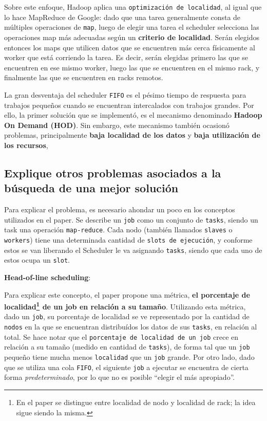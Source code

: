 \documentclass[11pt, a4paper, twoside]{article}
\begin{document}
Sobre este enfoque, Hadoop aplica una \texttt{optimización de localidad}, al
igual que lo hace MapReduce de Google: dado que una tarea generalmente consta de
múltiples operaciones de \texttt{map}, luego de elegir una tarea el scheduler
selecciona las operaciones map más adecuadas según un \textbf{criterio de
localidad}. Serán elegidos entonces los maps que utilicen datos que se
encuentren más cerca físicamente al worker que está corriendo la tarea. Es
decir, serán elegidas primero las que se encuentren en ese mismo worker, luego
las que se encuentren en el mismo rack, y finalmente las que se encuentren en
racks remotos.

La gran desventaja del scheduler \texttt{FIFO} es el pésimo tiempo de respuesta
para trabajos pequeños cuando se encuentran intercalados con trabajos grandes.
Por ello, la primer solución que se implementó, es el mecanismo denominado
\textbf{Hadoop On Demand (HOD)}. Sin embargo, este mecanismo también ocasionó
problemas, principalmente \textbf{baja localidad de los datos} y \textbf{baja
utilización de los recursos},

\clearpage
\subsection {\footnotesize Explique otros problemas asociados a la búsqueda de una mejor solución}
\label{investigacion-5}

Para explicar el problema, es necesario ahondar un poco en los conceptos
utilizados en el paper. Se describe un \texttt{job} como un conjunto de
\texttt{tasks}, siendo un task una operación \texttt{map-reduce}. Cada nodo
(también llamados \texttt{slaves} o \texttt{workers}) tiene una determinada
cantidad de \texttt{slots de ejecución}, y conforme estos se van liberando el
Scheduler le va asignando \texttt{tasks}, siendo que cada uno de estos ocupa
un \texttt{slot}.



\textbf{Head-of-line scheduling}:

Para explicar este concepto, el paper propone
una métrica, \textbf{el porcentaje de localidad\footnote{En el paper se
distingue entre localidad de nodo y localidad de rack; la idea sigue siendo la
misma.} de un job en relación a su tamaño}. Utilizando esta métrica, dado un
\texttt{job}, su porcentaje de localidad se ve representado por la cantidad de
\texttt{nodos} en la que se encuentran distribuídos los datos de sus
\texttt{tasks}, en relación al total. Se hace notar que el \texttt{porcentaje
de localidad de un job} crece en relación a su tamaño (medido en cantidad de
\texttt{tasks}), de forma tal que un \texttt{job} pequeño tiene mucha menos
\texttt{localidad} que un \texttt{job} grande. Por otro lado, dado que se
utiliza una cola \texttt{FIFO}, el siguiente \texttt{job} a ejecutar se
encuentra de cierta forma \emph{predeterminado}, por lo que no es posible
``elegir el más apropiado''.
\end{document}
